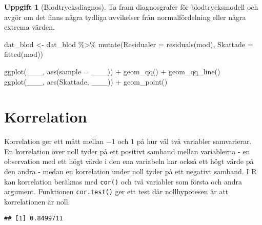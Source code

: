\documentclass[
]{book}
\newenvironment{Shaded}{\begin{snugshade}}{\end{snugshade}}
\newcommand{\AttributeTok}[1]{\textcolor[rgb]{0.77,0.63,0.00}{#1}}
\newcommand{\FunctionTok}[1]{\textcolor[rgb]{0.00,0.00,0.00}{#1}}
\newcommand{\NormalTok}[1]{#1}
\newcommand{\OtherTok}[1]{\textcolor[rgb]{0.56,0.35,0.01}{#1}}
\newcommand{\SpecialCharTok}[1]{\textcolor[rgb]{0.00,0.00,0.00}{#1}}
\theoremstyle{definition}
\theoremstyle{definition}
\theoremstyle{definition}
\newtheorem{exercise}{Uppgift}[chapter]
\theoremstyle{definition}
\theoremstyle{remark}
\begin{document}
\begin{exercise}[Blodtrycksdiagnos]

Ta fram diagnosgrafer för blodtrycksmodell och avgör om det finns några tydliga avvikelser från normalfördelning eller några extrema värden.

\begin{Shaded}
\begin{Highlighting}[]
\NormalTok{dat\_blod }\OtherTok{\textless{}{-}}\NormalTok{ dat\_blod }\SpecialCharTok{\%\textgreater{}\%} 
  \FunctionTok{mutate}\NormalTok{(}\AttributeTok{Residualer =} \FunctionTok{residuals}\NormalTok{(mod),}
         \AttributeTok{Skattade =} \FunctionTok{fitted}\NormalTok{(mod))}

\FunctionTok{ggplot}\NormalTok{(\_\_\_, }\FunctionTok{aes}\NormalTok{(}\AttributeTok{sample =}\NormalTok{ \_\_\_)) }\SpecialCharTok{+} \FunctionTok{geom\_qq}\NormalTok{() }\SpecialCharTok{+} \FunctionTok{geom\_qq\_line}\NormalTok{()}
\FunctionTok{ggplot}\NormalTok{(\_\_\_, }\FunctionTok{aes}\NormalTok{(Skattade, \_\_\_)) }\SpecialCharTok{+} \FunctionTok{geom\_point}\NormalTok{()}
\end{Highlighting}
\end{Shaded}

\end{exercise}

\hypertarget{korrelation}{%
\section{Korrelation}\label{korrelation}}

Korrelation ger ett mått mellan \(-1\) och \(1\) på hur väl två variabler samvarierar. En korrelation över noll tyder på ett positivt samband mellan variablerna - en observation med ett högt värde i den ena variabeln har också ett högt värde på den andra - medan en korrelation under noll tyder på ett negativt samband. I R kan korrelation beräknas med \texttt{cor()} och två variabler som första och andra argument. Funktionen \texttt{cor.test()} ger ett test där nollhypotesen är att korrelationen är noll.

\begin{Shaded}
\end{Shaded}

\begin{verbatim}
## [1] 0.8499711
\end{verbatim}
\end{document}

